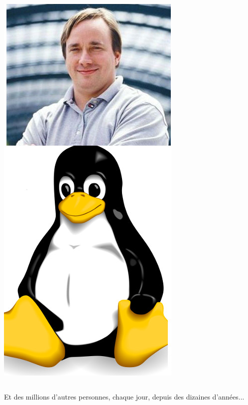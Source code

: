 \documentclass{beamer}
\begin{document}
\begin{frame}
\begin{columns}[c]
\begin{center}
\includegraphics[scale=1] {./images/linux.jpg} 
\end{center}
\end{columns}
\end{frame}

\begin{frame}
\begin{center}
\Huge{Et des millions d'autres personnes, chaque jour, depuis des dizaines d'années...}
\end{center}
\end{frame}
\end{document}
